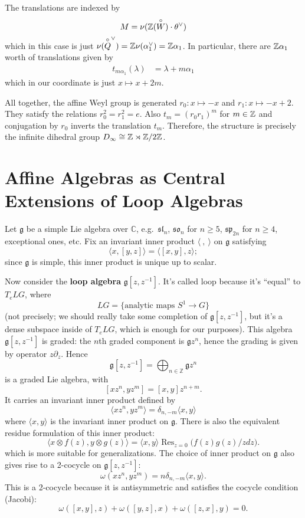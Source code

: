 \documentclass[12pt]{article}
\begin{document}
\begin{example}
The translations are indexed by \[M = \nu(\mathbb{Z}(\overset{\circ}{W})\cdot \theta^\vee)\] which in this case is just $\nu(\overset{\circ}{Q}^\vee) = \mathbb{Z} \nu(\alpha_1^\vee) = \mathbb{Z} \alpha_1$. In particular, there are $\mathbb{Z}\alpha_1$ worth of translations given by \begin{align*}
    t_{m\alpha_1}(\lambda) &= \lambda + m\alpha_1 
\end{align*} which in our coordinate is just $x \mapsto x + 2m$. 

All together, the affine Weyl group is generated $r_0:x \mapsto -x$ and $r_1:x \mapsto -x + 2$. They satisfy the relations $r_0^2 = r_1^2 = e$. Also $t_m = (r_0 r_1)^m$ for $m \in \mathbb{Z}$ and conjugation by $r_0$ inverts the translation $t_m$. Therefore, the structure is precisely the infinite dihedral group $D_\infty \cong \mathbb{Z} \rtimes \mathbb{Z}/2\mathbb{Z}$.
\end{example}

\section{Affine Algebras as Central Extensions of Loop Algebras}
Let $\mathfrak{g}$ be a simple Lie algebra over $\mathbb{C}$, e.g.\ $\mathfrak{sl}_n$, $\mathfrak{so}_n$ for $n \geq 5$, $\mathfrak{sp}_{2n}$ for $n \geq 4$, exceptional ones, etc. Fix an invariant inner product $\langle\ ,\ \rangle$ on $\mathfrak{g}$ satisfying
\[
    \langle x, [y,z]\rangle = \langle [x,y], z\rangle;
\]
since $\mathfrak{g}$ is simple, this inner product is unique up to scalar.

Now consider the \textbf{loop algebra} $\mathfrak{g}[z,z^{-1}]$. It's called loop because it's “equal” to $T_e LG$, where
\[
    LG = \{\text{analytic maps } S^1 \to G\}
\]
(not precisely; we should really take some completion of $\mathfrak{g}[z,z^{-1}]$, but it's a dense subspace inside of $T_e LG$, which is enough for our purposes). This algebra $\mathfrak{g}[z,z^{-1}]$ is graded: the $n$th graded component is $\mathfrak{g} z^n$, hence the grading is given by operator $z\partial_z$. Hence
\[
    \mathfrak{g}[z,z^{-1}] = \bigoplus_{n \in \mathbb{Z}} \mathfrak{g}z^n
\]
is a graded Lie algebra, with
\[
    [xz^n, yz^m] = [x,y] z^{n+m}.
\]
It carries an invariant inner product defined by
\[
    \langle xz^n, yz^m \rangle = \delta_{n,-m} \langle x,y \rangle
\] where $\langle x,y \rangle$ is the invariant inner product on $\mathfrak{g}$. There is also the equivalent residue formulation of this inner product:
\[
    \langle x\otimes f(z), y\otimes g(z) \rangle = \langle x,y \rangle \operatorname{Res}_{z=0}\bigg(f(z)g(z)/z dz\bigg).
\] which is more suitable for generalizations. The choice of inner product on $\mathfrak{g}$ also gives rise to a 2-cocycle on $\mathfrak{g}[z,z^{-1}]$:
\[
    \omega(xz^n, yz^m) = n \delta_{n,-m} \langle x,y \rangle.
\]
This is a 2-cocycle because it is antisymmetric and satisfies the cocycle condition (Jacobi):
\[
    \omega([x,y],z) + \omega([y,z],x) + \omega([z,x],y) = 0.
\]
\end{document}
